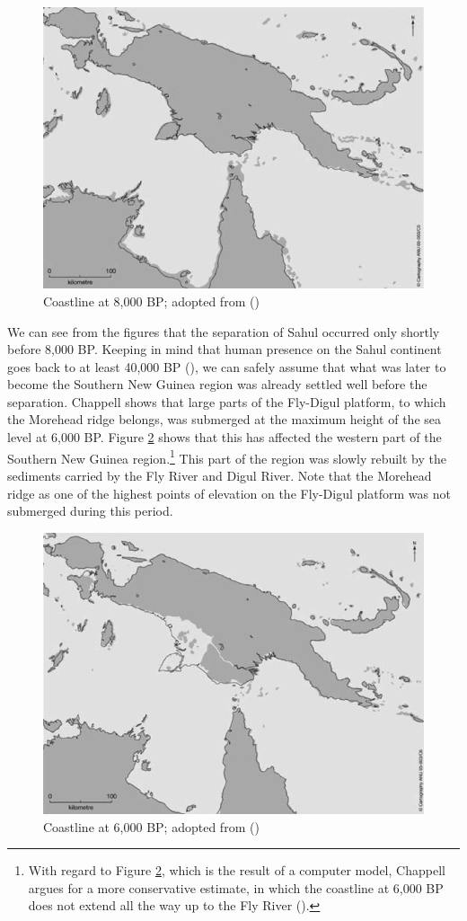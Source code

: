 \begin{figure}
  
    \includegraphics[width=.6\textwidth]{figures/chappell8k.png}
  \caption[Coastline at 8,000 BP]{Coastline at 8,000 BP; adopted from (\citealt[528]{Chappell:2005coastal})}
  \label{fig:figures_chappell8k}
\end{figure}

We can see from the figures that the separation of Sahul occurred only shortly before 8,000 BP. Keeping in mind that human presence on the Sahul continent goes back to at least 40,000 BP (\citealt{Golson:2005intro}), we can safely assume that what was later to become the Southern New Guinea region was already settled well before the separation. Chappell shows that large parts of the Fly-Digul platform, to which the Morehead ridge belongs, was submerged at the maximum height of the sea level at 6,000 BP. Figure \ref{fig:figures_chappell6k} shows that this has affected the western part of the Southern New Guinea region.\footnote{With regard to Figure \ref{fig:figures_chappell6k}, which is the result of a computer model, Chappell argues for a more conservative estimate, in which the coastline at 6,000 BP does not extend all the way up to the Fly River (\citeyear[531]{Chappell:2005coastal}).} This part of the region was slowly rebuilt by the sediments carried by the Fly River and Digul River. Note that the Morehead ridge as one of the highest points of elevation on the Fly-Digul platform was not submerged during this period.

\begin{figure}
  
    \includegraphics[width=.6\textwidth]{figures/chappell6k.png}
  \caption[Coastline at 6,000 BP]{Coastline at 6,000 BP; adopted from (\citealt[528]{Chappell:2005coastal})}
  \label{fig:figures_chappell6k}
\end{figure}

